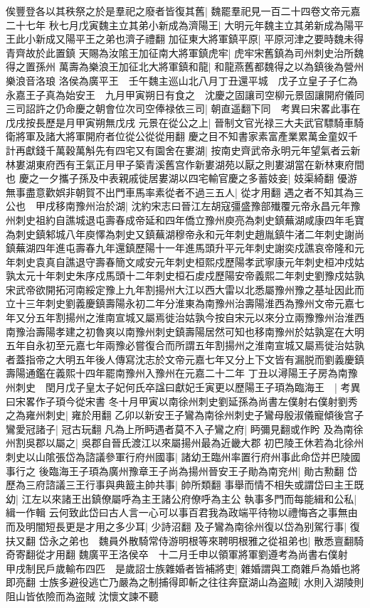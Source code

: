 俟豐登各以其秩祭之於是羣祀之廢者皆復其舊|{
	魏罷羣祀見一百二十四卷文帝元嘉二十七年}
秋七月戊寅魏主立其弟小新成為濟陽王|{
	大明元年魏主立其弟新成為陽平王此小新成又陽平王之弟也濟子禮翻}
加征東大將軍鎮平原|{
	平原河津之要時魏未得青齊故於此置鎮}
天賜為汝隂王加征南大將軍鎮虎牢|{
	虎牢宋舊鎮為司州刺史治所魏得之置孫州}
萬壽為樂浪王加征北大將軍鎮和龍|{
	和龍燕舊都魏得之以為鎮後為營州樂浪音洛琅}
洛侯為廣平王　壬午魏主巡山北八月丁丑還平城　戊子立皇子子仁為永嘉王子真為始安王　九月甲寅朔日有食之　沈慶之固讓司空柳元景固讓開府儀同三司詔許之仍命慶之朝會位次司空俸禄依三司|{
	朝直遥翻下同　考異曰宋畧此事在戊戌按長歷是月甲寅朔無戊戌}
元景在從公之上|{
	晉制文官光禄三大夫武官驃騎車騎衛將軍及諸大將軍開府者位從公從從用翻}
慶之目不知書家素富產業累萬金童奴千計再獻錢千萬穀萬斛先有四宅又有園舍在婁湖|{
	按南史齊武帝永明元年望氣者云新林婁湖東府西有王氣正月甲子築青溪舊宫作新婁湖苑以厭之則婁湖當在新林東府間也}
慶之一夕攜子孫及中表親戚徙居婁湖以四宅輸官慶之多蓄妓妾|{
	妓渠綺翻}
優游無事盡意歡娯非朝賀不出門車馬率素從者不過三五人|{
	從才用翻}
遇之者不知其為三公也　甲戌移南豫州治於湖|{
	沈約宋志曰晉江左胡寇彊盛豫部殱覆元帝永昌元年豫州刺史祖約自譙城退屯壽春成帝延和四年僑立豫州庾亮為刺史鎮蕪湖咸康四年毛寶為刺史鎮邾城八年庾懌為刺史又鎮蕪湖穆帝永和元年刺史趙胤鎮牛渚二年刺史謝尚鎮蕪湖四年進屯壽春九年還鎮歷陽十一年進馬頭升平元年刺史謝奕戍譙哀帝隆和元年刺史袁真自譙退守壽春簡文咸安元年刺史桓熙戍歷陽孝武寧康元年刺史桓冲戍姑孰太元十年刺史朱序戍馬頭十二年刺史桓石䖍戍歷陽安帝義熙二年刺史劉豫戍姑孰宋武帝欲開拓河南綏定豫上九年割揚州大江以西大雷以北悉屬豫州豫之基址因此而立十三年刺史劉義慶鎮壽陽永初二年分淮東為南豫州治壽陽淮西為豫州文帝元嘉七年又分五年割揚州之淮南宣城又屬焉徙治姑孰今按自宋元以來分立兩豫豫州治淮西南豫治壽陽孝建之初魯爽以南豫州刺史鎮壽陽居然可知也移南豫州於姑孰寔在大明五年自永初至元嘉七年兩豫必嘗復合而所謂五年割揚州之淮南宣城又屬焉徙治姑孰者蓋指帝之大明五年後人傳寫沈志於文帝元嘉七年又分上下文皆有漏脱而劉義慶鎮壽陽通鑑在義熙十四年罷南豫州入豫州在元嘉二十二年}
丁丑以潯陽王子房為南豫州刺史　閏月戊子皇太子妃何氏卒諡曰獻妃壬寅更以歷陽王子頊為臨海王　|{
	考異曰宋畧作子頊今從宋書}
冬十月甲寅以南徐州刺史劉延孫為尚書左僕射右僕射劉秀之為雍州刺史|{
	雍於用翻}
乙卯以新安王子鸞為南徐州刺史子鸞母殷淑儀寵傾後宫子鸞愛冠諸子|{
	冠古玩翻}
凡為上所眄遇者莫不入子鸞之府|{
	眄彌見翻或作盻}
及為南徐州割吳郡以屬之|{
	吳郡自晉氏渡江以來屬揚州最為近畿大郡}
初巴陵王休若為北徐州刺史以山隂張岱為諮議參軍行府州國事|{
	諸幼王臨州率置行府州事此命岱并巴陵國事行之}
後臨海王子頊為廣州豫章王子尚為揚州晉安王子勛為南兖州|{
	勛古勲翻}
岱歷為三府諮議三王行事與典籖主帥共事|{
	帥所類翻}
事舉而情不相失或謂岱曰主王既幼|{
	江左以來諸王出鎮僚屬呼為主王諸公府僚呼為主公}
執事多門而每能緝和公私|{
	緝一作輯}
云何致此岱曰古人言一心可以事百君我為政端平待物以禮悔吝之事無由而及明闇短長更是才用之多少耳|{
	少詩沼翻}
及子鸞為南徐州復以岱為别駕行事|{
	復扶又翻}
岱永之弟也　魏員外散騎常侍游明根等來聘明根雅之從祖弟也|{
	散悉亶翻騎奇寄翻從才用翻}
魏廣平王洛侯卒　十二月壬申以領軍將軍劉遵考為尚書右僕射　甲戌制民戶歲輸布四匹　是歲詔士族雜婚者皆補將吏|{
	雜婚謂與工商雜戶為婚也將即亮翻}
士族多避役逃亡乃嚴為之制捕得即斬之往往奔竄湖山為盗賊|{
	水則入湖陵則阻山皆依險而為盗賊}
沈懷文諫不聽

